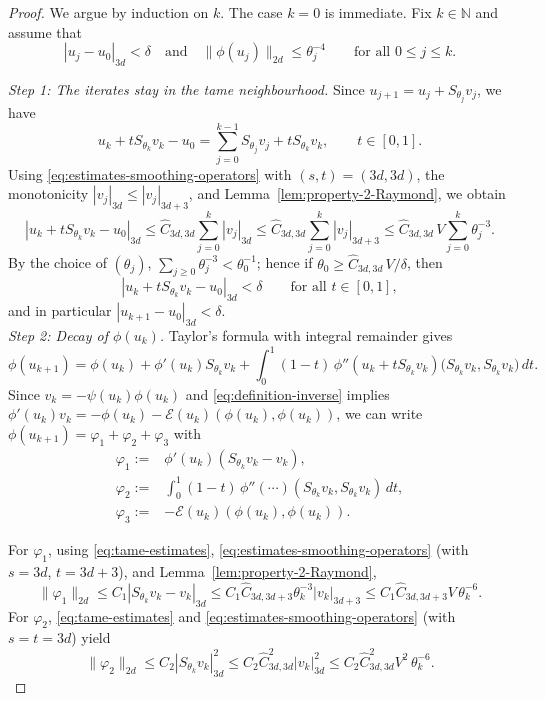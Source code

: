 \documentclass[11pt]{amsart}
\begin{document}
\begin{proof}
		We argue by induction on $k$. The case $k=0$ is immediate. Fix $k\in\mathbb{N}$ and assume that
	\[
	|u_j-u_0|_{3d}<\delta
	\quad\text{and}\quad
	\|\phi(u_j)\|_{2d}\le \theta_j^{-4}
	\qquad\text{for all }0\le j\le k.
	\]
	
	\smallskip
	\noindent\textit{Step 1: The iterates stay in the tame neighbourhood.}
	Since $u_{j+1}=u_j+S_{\theta_j}v_j$, we have
	\[
	u_k+tS_{\theta_k}v_k-u_0=\sum_{j=0}^{k-1}S_{\theta_j}v_j+tS_{\theta_k}v_k,
	\qquad t\in[0,1].
	\]
	Using \eqref{eq:estimates-smoothing-operators} with $(s,t)=(3d,3d)$, the monotonicity
	$|v_j|_{3d}\le |v_j|_{3d+3}$, and Lemma~\ref{lem:property-2-Raymond}, we obtain
	\[
	|u_k+tS_{\theta_k}v_k-u_0|_{3d}
	\le \widehat C_{3d,3d}\sum_{j=0}^{k}|v_j|_{3d}
	\le \widehat C_{3d,3d}\sum_{j=0}^{k}|v_j|_{3d+3}
	\le \widehat C_{3d,3d}\,V\sum_{j=0}^{k}\theta_j^{-3}.
	\]
	By the choice of $(\theta_j)$, $\sum_{j\ge 0}\theta_j^{-3}<\theta_0^{-1}$; hence if
	$\theta_0\ge \widehat C_{3d,3d}\,V/\delta$, then
	\[
	|u_k+tS_{\theta_k}v_k-u_0|_{3d}<\delta
	\qquad\text{for all }t\in[0,1],
	\]
	and in particular $|u_{k+1}-u_0|_{3d}<\delta$.
	\\

	\smallskip
	\noindent\textit{Step 2: Decay of $\phi(u_k)$.}
	Taylor's formula with integral remainder gives
	\[
	\phi(u_{k+1})
	=\phi(u_k)+\phi'(u_k)S_{\theta_k}v_k
	+\int_0^1(1-t)\,\phi''(u_k+tS_{\theta_k}v_k)\bigl(S_{\theta_k}v_k,S_{\theta_k}v_k\bigr)\,dt.
	\]
	Since $v_k=-\psi(u_k)\phi(u_k)$ and \eqref{eq:definition-inverse} implies
	$\phi'(u_k)v_k=-\phi(u_k)-\mathcal E(u_k)(\phi(u_k),\phi(u_k))$,
	we can write $\phi(u_{k+1})=\varphi_1+\varphi_2+\varphi_3$ with
	\begin{align*}
	\varphi_1:=&\phi'(u_k)(S_{\theta_k}v_k-v_k), \\
	\varphi_2:=&\int_0^1(1-t)\,\phi''(\cdots)(S_{\theta_k}v_k,S_{\theta_k}v_k)\,dt,\\
	\varphi_3:=&-\mathcal E(u_k)(\phi(u_k),\phi(u_k)).	
	\end{align*}

	For $\varphi_1$, using \eqref{eq:tame-estimates}, \eqref{eq:estimates-smoothing-operators} (with $s=3d$, $t=3d+3$), and Lemma~\ref{lem:property-2-Raymond},
	\begin{equation}\label{eq:estimate-varphi-1}
		\|\varphi_1\|_{2d}
		\le C_1|S_{\theta_k}v_k-v_k|_{3d}
		\le C_1\widehat C_{3d,3d+3}\theta_k^{-3}|v_k|_{3d+3}
		\le C_1\widehat C_{3d,3d+3}V\,\theta_k^{-6}.
	\end{equation}
	For $\varphi_2$, \eqref{eq:tame-estimates} and \eqref{eq:estimates-smoothing-operators} (with $s=t=3d$) yield
	\begin{equation}\label{eq:estimate-varphi-2}
		\|\varphi_2\|_{2d}
		\le C_2|S_{\theta_k}v_k|_{3d}^2
		\le C_2\widehat C_{3d,3d}^2|v_k|_{3d}^2
		\le C_2\widehat C_{3d,3d}^2V^2\,\theta_k^{-6}.
	\end{equation}
	

\end{proof}
\end{document}
